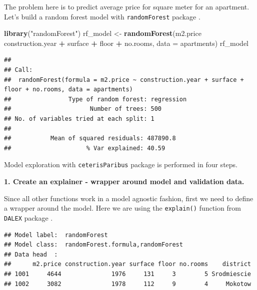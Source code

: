 \documentclass[]{krantz}
\newenvironment{Shaded}{\begin{snugshade}}{\end{snugshade}}
\newcommand{\DataTypeTok}[1]{\textcolor[rgb]{0.13,0.29,0.53}{#1}}
\newcommand{\KeywordTok}[1]{\textcolor[rgb]{0.13,0.29,0.53}{\textbf{#1}}}
\newcommand{\NormalTok}[1]{#1}
\newcommand{\OperatorTok}[1]{\textcolor[rgb]{0.81,0.36,0.00}{\textbf{#1}}}
\newcommand{\StringTok}[1]{\textcolor[rgb]{0.31,0.60,0.02}{#1}}
\theoremstyle{definition}
\theoremstyle{definition}
\theoremstyle{definition}
\theoremstyle{remark}
\begin{document}
The problem here is to predict average price for square meter for an
apartment. Let's build a random forest model with \texttt{randomForest}
package \citep{R-randomForest}.

\begin{Shaded}
\begin{Highlighting}[]
\KeywordTok{library}\NormalTok{(}\StringTok{"randomForest"}\NormalTok{)}
\NormalTok{rf_model <-}\StringTok{ }\KeywordTok{randomForest}\NormalTok{(m2.price }\OperatorTok{~}\StringTok{ }\NormalTok{construction.year }\OperatorTok{+}\StringTok{ }\NormalTok{surface }\OperatorTok{+}\StringTok{ }\NormalTok{floor }\OperatorTok{+}
\StringTok{      }\NormalTok{no.rooms, }\DataTypeTok{data =}\NormalTok{ apartments)}
\NormalTok{rf_model}
\end{Highlighting}
\end{Shaded}

\begin{verbatim}
## 
## Call:
##  randomForest(formula = m2.price ~ construction.year + surface +      floor + no.rooms, data = apartments) 
##                Type of random forest: regression
##                      Number of trees: 500
## No. of variables tried at each split: 1
## 
##           Mean of squared residuals: 487890.8
##                     % Var explained: 40.59
\end{verbatim}

Model exploration with \texttt{ceterisParibus} package is performed in
four steps.

\textbf{1. Create an explainer - wrapper around model and validation
data.}

Since all other functions work in a model agnostic fashion, first we
need to define a wrapper around the model. Here we are using the
\texttt{explain()} function from \texttt{DALEX} package \citep{R-DALEX}.

\begin{Shaded}
\end{Shaded}

\begin{verbatim}
## Model label:  randomForest 
## Model class:  randomForest.formula,randomForest 
## Data head  :
##      m2.price construction.year surface floor no.rooms    district
## 1001     4644              1976     131     3        5 Srodmiescie
## 1002     3082              1978     112     9        4     Mokotow
\end{verbatim}
\end{document}
